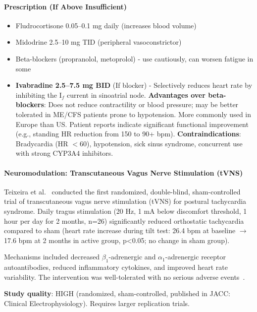 \paragraph{Prescription (If Above Insufficient)}
\begin{itemize}
    \item Fludrocortisone 0.05--0.1 mg daily (increases blood volume)
    \item Midodrine 2.5--10 mg TID (peripheral vasoconstrictor)
    \item Beta-blockers (propranolol, metoprolol) - use cautiously, can worsen fatigue in some
    \item \textbf{Ivabradine 2.5--7.5 mg BID} (If blocker) - Selectively reduces heart rate by inhibiting the I$_f$ current in sinoatrial node. \textbf{Advantages over beta-blockers}: Does not reduce contractility or blood pressure; may be better tolerated in ME/CFS patients prone to hypotension. More commonly used in Europe than US. Patient reports indicate significant functional improvement (e.g., standing HR reduction from 150 to 90+ bpm). \textbf{Contraindications}: Bradycardia (HR $<$60), hypotension, sick sinus syndrome, concurrent use with strong CYP3A4 inhibitors.
\end{itemize}

\paragraph{Neuromodulation: Transcutaneous Vagus Nerve Stimulation (tVNS)}
\label{sec:tvns-pots}

\begin{achievement}
\label{achievement:tvns-pots-rct}
Teixeira et al.~\cite{Teixeira2024POTS} conducted the first randomized, double-blind, sham-controlled trial of transcutaneous vagus nerve stimulation (tVNS) for postural tachycardia syndrome. Daily tragus stimulation (20 Hz, 1 mA below discomfort threshold, 1 hour per day for 2 months, n=26) significantly reduced orthostatic tachycardia compared to sham (heart rate increase during tilt test: 26.4 bpm at baseline $\to$ 17.6 bpm at 2 months in active group, p<0.05; no change in sham group).

Mechanisms included decreased $\beta_1$-adrenergic and $\alpha_1$-adrenergic receptor autoantibodies, reduced inflammatory cytokines, and improved heart rate variability. The intervention was well-tolerated with no serious adverse events~\cite{Farmer2022taVNS}.

\textbf{Study quality}: HIGH (randomized, sham-controlled, published in JACC: Clinical Electrophysiology). Requires larger replication trials.
\end{achievement}

